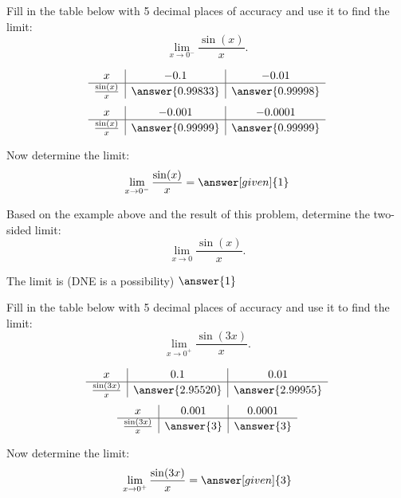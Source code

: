 \documentclass{ximera}
\begin{document}
\begin{problem}[problem 6]
Fill in the table below with 5 decimal places of accuracy and use it to find the limit:
\[\lim_{x \to 0^-} \frac{\sin(x)}{x}.\]

\begin{prompt}
\begin{center}
\[
\begin{array}{ c | c | c }
  x & -0.1 & -0.01   \\ 
	\hline 
	 \frac{\sin(x)}{x} & \answer{0.99833} & \answer{0.99998} 
\end{array}
\]
\[
\begin{array}{ c | c | c  }
  x  & -0.001 & -0.0001 \\ 
	\hline 
	 \frac{\sin(x)}{x}  & \answer{0.99999} & \answer{0.99999}
\end{array}
\]
\end{center}
Now determine the limit:
\[
\lim_{x \to 0^-} \frac{\sin(x)}{x} = \answer[given]{1}
\]
\end{prompt}

Based on the example above and the result of this problem, determine the two-sided limit:
\[
\lim_{x \to 0} \frac{\sin(x)}{x}.
\]

The limit is (DNE is a possibility) $\answer{1}$
\end{problem}



\begin{problem}[problem 7]
Fill in the table below with 5 decimal places of accuracy and use it to find the limit:
\[\lim_{x \to 0^+} \frac{\sin(3x)}{x}.\]

\begin{prompt}
\begin{center}
\[
\begin{array}{ c | c | c }
  x & 0.1 & 0.01   \\ 
	\hline 
	 \frac{\sin(3x)}{x} & \answer{2.95520} & \answer{2.99955} 
\end{array}
\]
\[
\begin{array}{ c | c | c  }
  x  & 0.001 & 0.0001 \\ 
	\hline 
	 \frac{\sin(3x)}{x}  & \answer{3} & \answer{3}
\end{array}
\]
\end{center}
Now determine the limit:
\[
\lim_{x \to 0^+} \frac{\sin(3x)}{x} = \answer[given]{3}
\]
\end{prompt}
\end{problem}
\end{document}
